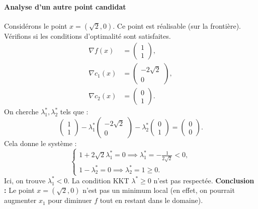 \paragraph{Analyse d'un autre point candidat}
Considérons le point $x = (\sqrt{2}, 0)$. Ce point est réalisable (sur la frontière).
Vérifions si les conditions d'optimalité sont satisfaites.
\begin{align*}
    \nabla f(x) &= \begin{pmatrix} 1 \\ 1 \end{pmatrix}, \\
    \nabla c_1(x) &= \begin{pmatrix} -2\sqrt{2} \\ 0 \end{pmatrix}, \\
    \nabla c_2(x) &= \begin{pmatrix} 0 \\ 1 \end{pmatrix}.
\end{align*}
On cherche $\lambda_1^*, \lambda_2^*$ tels que :
\begin{equation}
    \begin{pmatrix} 1 \\ 1 \end{pmatrix} - \lambda_1^* \begin{pmatrix} -2\sqrt{2} \\ 0 \end{pmatrix} - \lambda_2^* \begin{pmatrix} 0 \\ 1 \end{pmatrix} = \begin{pmatrix} 0 \\ 0 \end{pmatrix}.
\end{equation}
Cela donne le système :
\begin{equation}
    \begin{cases}
        1 + 2\sqrt{2} \lambda_1^* = 0 \implies \lambda_1^* = -\frac{1}{2\sqrt{2}} < 0, \\
        1 - \lambda_2^* = 0 \implies \lambda_2^* = 1 \ge 0.
    \end{cases}
\end{equation}
Ici, on trouve $\lambda_1^* < 0$. La condition KKT $\lambda^* \ge 0$ n'est pas respectée.
\textbf{Conclusion :} Le point $x = (\sqrt{2}, 0)$ n'est pas un minimum local (en effet, on pourrait augmenter $x_1$ pour diminuer $f$ tout en restant dans le domaine).

